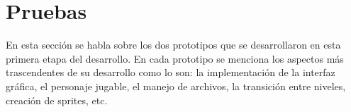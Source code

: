 \section{Pruebas}
En esta sección se habla sobre los dos prototipos que se desarrollaron en esta 
primera etapa del desarrollo. En cada prototipo se menciona los aspectos más 
trascendentes de su desarrollo como lo son: la implementación de la interfaz 
gráfica, el personaje jugable, el manejo de archivos, la transición entre 
niveles, creación de sprites, etc.    


		
